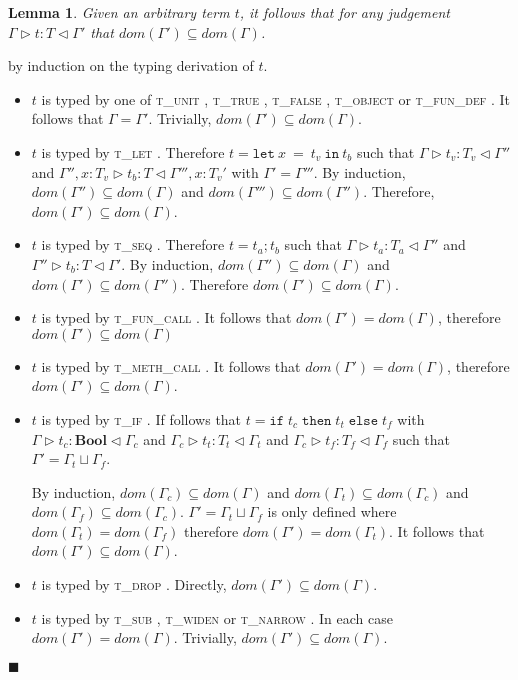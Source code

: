 \documentclass[preprint]{sigplanconf}
\newtheorem{lem}{Lemma}
\newcommand{\tunit}{\textsc{t\_unit} }
\newcommand{\ttrue}{\textsc{t\_true} }
\newcommand{\tfalse}{\textsc{t\_false} }
\newcommand{\tobj}{\textsc{t\_object} }
\newcommand{\tfundef}{\textsc{t\_fun\_def} }
\newcommand{\tlet}{\textsc{t\_let} }
\newcommand{\tif}{\textsc{t\_if} }
\newcommand{\tseq}{\textsc{t\_seq} }
\newcommand{\tfunc}{\textsc{t\_fun\_call} }
\newcommand{\tmethc}{\textsc{t\_meth\_call} }
\newcommand{\tdrop}{\textsc{t\_drop} }
\newcommand{\tsub}{\textsc{t\_sub} }
\newcommand{\tnarrow}{\textsc{t\_narrow} }
\newcommand{\twiden}{\textsc{t\_widen} }
\newcommand{\typerule}[4]{#1 \triangleright #2 : #3 \triangleleft #4}
\newcommand{\boolt}{\mathbf{Bool}}
\newcommand{\lett}[3]{\mathtt{let}\:#1\:\mathtt{=}\:#2\:\mathtt{in}\:#3}
\newcommand{\ift}[3]{\mathtt{if} \; #1 \; \mathtt{then} \; #2 \; \mathtt{else} \; #3}
\newcommand{\qed}{$\blacksquare$}
\newenvironment{proof}{\vspace{1ex}\noindent{\bf Proof}\hspace{0.5em}}
  {\hfill\qed\vspace{1ex}}
\begin{document}
\begin{lem}
\label{lem:ctxsubset}
Given an arbitrary term $t$, it follows that for any judgement
$\typerule{\Gamma}{t}{T}{\Gamma'}$ that $dom(\Gamma') \subseteq dom(\Gamma)$.
\end{lem}
\begin{proof}
by induction on the typing derivation of $t$.

\begin{itemize}
\item $t$ is typed by one of \tunit, \ttrue, \tfalse,
\tobj or \tfundef. It follows that $\Gamma = \Gamma'$. Trivially,
$dom(\Gamma') \subseteq dom(\Gamma)$.

\item $t$ is typed by \tlet. Therefore $t = \lett{x}{t_v}{t_b}$
such that $\typerule{\Gamma}{t_v}{T_v}{\Gamma''}$ and
$\typerule{\Gamma'', x : T_v}{t_b}{T}{\Gamma''', x : T_v'}$
with $\Gamma' = \Gamma'''$.
By induction, $dom(\Gamma'') \subseteq dom(\Gamma)$ and $dom(\Gamma''') \subseteq dom(\Gamma'')$.
Therefore, $dom(\Gamma') \subseteq dom(\Gamma)$.

\item $t$ is typed by \tseq. Therefore $t = t_a ; t_b$ such that
$\typerule{\Gamma}{t_a}{T_a}{\Gamma''}$ and
$\typerule{\Gamma''}{t_b}{T}{\Gamma'}$. By induction,
$dom(\Gamma'') \subseteq dom(\Gamma)$ and $dom(\Gamma') \subseteq dom(\Gamma'')$. Therefore
$dom(\Gamma') \subseteq dom(\Gamma)$.

\item $t$ is typed by \tfunc. It follows that $dom(\Gamma') = dom(\Gamma)$,
therefore $dom(\Gamma') \subseteq dom(\Gamma)$

\item $t$ is typed by \tmethc. It follows that $dom(\Gamma') = dom(\Gamma)$,
therefore $dom(\Gamma') \subseteq dom(\Gamma)$.

\item $t$ is typed by \tif. If follows that $t = \ift{t_c}{t_t}{t_f}$
with $\typerule{\Gamma}{t_c}{\boolt}{\Gamma_c}$
and $\typerule{\Gamma_c}{t_t}{T_t}{\Gamma_t}$
and $\typerule{\Gamma_c}{t_f}{T_f}{\Gamma_f}$ such that
$\Gamma' = \Gamma_t \sqcup \Gamma_f$.

By induction, $dom(\Gamma_c) \subseteq dom(\Gamma)$ and
$dom(\Gamma_t) \subseteq dom(\Gamma_c)$ and
$dom(\Gamma_f) \subseteq dom(\Gamma_c)$. $\Gamma' = \Gamma_t \sqcup \Gamma_f$
is only defined where $dom(\Gamma_t) = dom(\Gamma_f)$ therefore
$dom(\Gamma') = dom(\Gamma_t)$. It follows that
$dom(\Gamma') \subseteq dom(\Gamma)$.

\item $t$ is typed by \tdrop. Directly, $dom(\Gamma') \subseteq dom(\Gamma)$.

\item $t$ is typed by \tsub, \twiden or \tnarrow. In each case
$dom(\Gamma') = dom(\Gamma)$. Trivially, $dom(\Gamma') \subseteq dom(\Gamma)$.

\end{itemize}
\end{proof}
\end{document}
